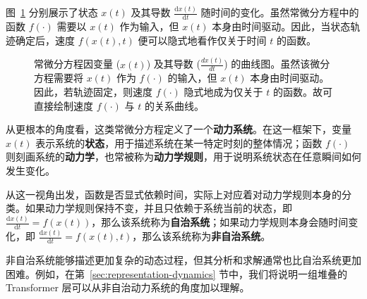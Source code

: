\documentclass[UTF8,a4paper,zihao=-4,oneside,openany]{ctexbook}
\makeatletter
\newcommand{\AMLFigure}[2][0.96\linewidth]{%
  \begingroup
  \let\AtBeginDocument\@gobble
  \endgroup
}
\makeatother
\begin{document}
图~\ref{fig:curve-of-an-ode} 分别展示了状态 \(x(t)\) 及其导数 \(\frac{\mathrm{d}x(t)}{\mathrm{d}t}\) 随时间的变化。虽然常微分方程中的函数 \(f(\cdot)\) 需要以 \(x(t)\) 作为输入，但 \(x(t)\) 本身由时间驱动。因此，当状态轨迹确定后，速度 \(f(x(t),t)\) 便可以隐式地看作仅关于时间 \(t\) 的函数。

\begin{figure}[!t]
\centering
\AMLFigure{figure-ode-example-curves}
\caption{常微分方程因变量 ($x(t)$) 及其导数 ($\frac{d x(t)}{d t}$) 的曲线图。虽然该微分方程需要将 $x(t)$ 作为 $f(\cdot)$ 的输入，但 $x(t)$ 本身由时间驱动。因此，若轨迹固定，则速度 $f(\cdot)$ 隐式地成为仅关于 $t$ 的函数。故可直接绘制速度 $f(\cdot)$ 与 $t$ 的关系曲线。}
\label{fig:curve-of-an-ode}
\end{figure}

从更根本的角度看，这类常微分方程定义了一个\textbf{动力系统}。在这一框架下，变量 \(x(t)\) 表示系统的\textbf{状态}，用于描述系统在某一特定时刻的整体情况；函数 \(f(\cdot)\) 则刻画系统的\textbf{动力学}，也常被称为\textbf{动力学规则}，用于说明系统状态在任意瞬间如何发生变化。

从这一视角出发，函数是否显式依赖时间，实际上对应着对动力学规则本身的分类。如果动力学规则保持不变，并且只依赖于系统当前的状态，即 \(\frac{\mathrm{d}x(t)}{\mathrm{d}t}=f(x(t))\)，那么该系统称为\textbf{自治系统}；如果动力学规则本身会随时间变化，即 \(\frac{\mathrm{d}x(t)}{\mathrm{d}t}=f(x(t),t)\)，那么该系统称为\textbf{非自治系统}。

非自治系统能够描述更加复杂的动态过程，但其分析和求解通常也比自治系统更加困难。例如，在第~\ref{sec:representation-dynamics} 节中，我们将说明一组堆叠的 Transformer 层可以从非自治动力系统的角度加以理解。
\end{document}
